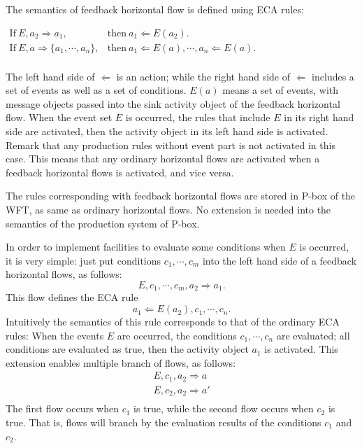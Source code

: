 The semantics of feedback horizontal flow is defined using ECA rules:
\begin{center}
$\begin{array}{rl}
 \mbox{If}\ E, a_2 \Longrightarrow a_1, & \mbox{then}\ a_1 
  \Leftarrow E(a_2).\\
 \mbox{If}\ E, a \Longrightarrow \{a_1, \cdots, a_n\}, & 
  \mbox{then}\ a_1 \Leftarrow E(a), \cdots, a_n \Leftarrow E(a).\\
\end{array}$
\end{center}
The left hand side of $\Leftarrow$ is an action; while the right hand
side of $\Leftarrow$ includes a set of events as well as a set of
conditions.  $E(a)$ means a set of events, with message objects passed
into the sink activity object of the feedback horizontal flow.  When the
event set $E$ is occurred, the rules that include $E$ in its right hand
side are activated, then the activity object in its left hand side is
activated.  Remark that any production rules without event part is not
activated in this case.  This means that any ordinary horizontal flows
are activated when a feedback horizontal flows is activated, and vice
versa.

The rules corresponding with feedback horizontal flows are stored in
P-box of the WFT, as same as ordinary horizontal flows.  No extension is 
needed into the semantics of the production system of P-box.

In order to implement facilities to evaluate some conditions when $E$ is
occurred, it is very simple: just put conditions $c_1, \cdots, c_m$ into 
the left hand side of a feedback horizontal flows, as follows:
\[
 E, c_1, \cdots, c_m, a_2 \Longrightarrow a_1.
\]
This flow defines the ECA rule
\[
 a_1 \Leftarrow E(a_2), c_1, \cdots, c_n.
\]
Intuitively the semantics of this rule corresponds to that of the
ordinary ECA rules: When the events $E$ are occurred, the conditions
$c_1, \cdots, c_n$ are evaluated; all conditions are evaluated as true,
then the activity object $a_1$ is activated.  This extension enables
multiple branch of flows, as follows:
\[
 \begin{array}{l}
  E, c_1, a_2 \Longrightarrow a\\
  E, c_2, a_2 \Longrightarrow a'\\
 \end{array}
\]
The first flow occurs when $c_1$ is true, while the second flow occurs
when $c_2$ is true.  That is, flows will branch by the evaluation
results of the conditions $c_1$ and $c_2$.

